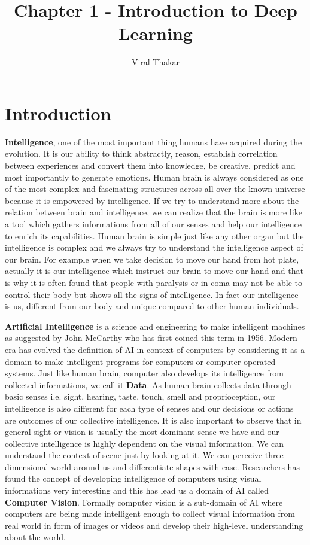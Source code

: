 \documentclass[a4paper]{article}
\title{Chapter 1 - Introduction to Deep Learning}
\author{Viral Thakar}
\begin{document}
\maketitle
\section{Introduction}
\textbf{Intelligence}, one of the most important thing humans have acquired during the evolution. It is our ability to think abstractly, reason, establish correlation between experiences and convert them into knowledge, be creative, predict and most importantly to generate emotions. Human brain is always considered as one of the most complex and fascinating structures across all over the known universe because it is empowered by intelligence. If we try to understand more about the relation between brain and intelligence, we can realize that the brain is more like a tool which gathers informations from all of our senses and help our intelligence to enrich its capabilities. Human brain is simple just like any other organ but the intelligence is complex and we always try to understand the intelligence aspect of our brain. For example when we take decision to move our hand from hot plate, actually it is our intelligence which instruct our brain to move our hand and that is why it is often found that people with paralysis or in coma may not be able to control their body but shows all the signs of intelligence. In fact our intelligence is us, different from our body and unique compared to other human individuals.

\textbf{Artificial Intelligence} is a science and engineering to make intelligent machines as suggested by John McCarthy who has first coined this term in 1956. Modern era has evolved the definition of AI in context of computers by considering it as a domain to make intelligent programs for computers or computer operated systems. Just like human brain, computer also develops its intelligence from collected informations, we call it \textbf{Data}. As human brain collects data through basic senses i.e. sight, hearing, taste, touch, smell and proprioception, our intelligence is also different for each type of senses and our decisions or actions are outcomes of our collective intelligence. It is also important to observe that in general sight or vision is usually the most dominant sense we have and our collective intelligence is highly dependent on the visual information. We can understand the context of scene just by looking at it. We can perceive three dimensional world around us and differentiate shapes with ease. Researchers has found the concept of developing intelligence of computers using visual informations very interesting and this has lead us a domain of AI called \textbf{Computer Vision}. Formally computer vision is a sub-domain of AI where computers are being made intelligent enough to collect visual information from real world in form of images or videos and develop their high-level understanding about the world. 
\end{document}
